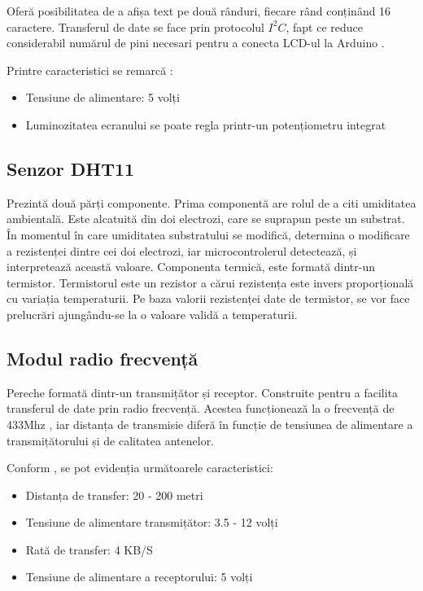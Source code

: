 	Oferă posibilitatea de a afișa text pe două rânduri, fiecare rând conținând 16 caractere. Transferul de date se face prin protocolul $I^2C$, fapt ce reduce considerabil numărul de pini necesari pentru a conecta LCD-ul la Arduino \cite{lcd}.

\vspace{1em}

	Printre caracteristici se remarcă \cite{lcd}:
 		\begin{itemize}
			\setlength{\itemindent}{2em}
			\itemsep0em
			\item Tensiune de alimentare: 5 volți 
			\item Luminozitatea ecranului se poate regla printr-un potențiometru integrat
		\end{itemize} 
	
\subsection{Senzor DHT11}

	Prezintă două părți componente. Prima componentă are rolul de a citi umiditatea ambientală. Este alcatuită din doi electrozi, care se suprapun peste un substrat. În momentul în care umiditatea substratului se modifică, determina o modificare a rezistenței dintre cei doi electrozi, iar microcontrolerul detectează, și interpretează această valoare. Componenta termică, este formată dintr-un termistor. Termistorul este un rezistor a cărui rezistența este invers proporțională cu variația temperaturii. Pe baza valorii rezistenței date de termistor, se vor face prelucrări ajungându-se la o valoare validă a temperaturii.

\subsection{Modul radio frecvență}

	Pereche formată dintr-un transmițător și receptor. Construite pentru a facilita transferul de date prin radio frecvență. Acestea funcționează la o frecvență de 433Mhz \cite{rfModule}, iar distanța de transmisie diferă în funcție de tensiunea de alimentare a transmițătorului și de calitatea antenelor.

	Conform \cite{rfModule}, se pot evidenția următoarele caracteristici:
 		\begin{itemize}
			\setlength{\itemindent}{2em}
			\itemsep0em
			\item Distanța de transfer: 20 - 200 metri
			\item Tensiune de alimentare transmițător: 3.5 - 12 volți
			\item Rată de transfer: 4 KB/S
			\item Tensiune de alimentare a receptorului: 5 volți
		\end{itemize} 

